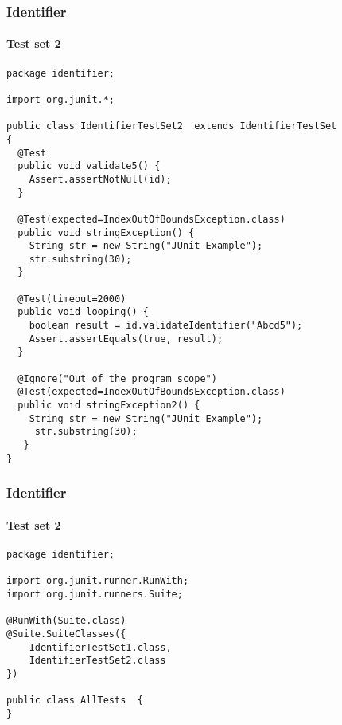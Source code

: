 \begin{frame}[fragile]
\frametitle{Identifier}
\framesubtitle{Test set 2}

\begin{lstlisting}
package identifier;

import org.junit.*;

public class IdentifierTestSet2  extends IdentifierTestSet
{
  @Test
  public void validate5() {
    Assert.assertNotNull(id);
  }

  @Test(expected=IndexOutOfBoundsException.class)
  public void stringException() {
    String str = new String("JUnit Example");
    str.substring(30);
  }

  @Test(timeout=2000)
  public void looping() {
    boolean result = id.validateIdentifier("Abcd5");
    Assert.assertEquals(true, result);
  }

  @Ignore("Out of the program scope")
  @Test(expected=IndexOutOfBoundsException.class)
  public void stringException2() {
    String str = new String("JUnit Example");
     str.substring(30);
   }
}
\end{lstlisting}
\end{frame}




\begin{frame}[fragile, hasprev=true, hasnext=false]
\frametitle{Identifier}
\framesubtitle{Test set 2}

\begin{lstlisting}
package identifier;

import org.junit.runner.RunWith;
import org.junit.runners.Suite;

@RunWith(Suite.class)
@Suite.SuiteClasses({
    IdentifierTestSet1.class,
    IdentifierTestSet2.class
})

public class AllTests  {
}
\end{lstlisting}
\end{frame}